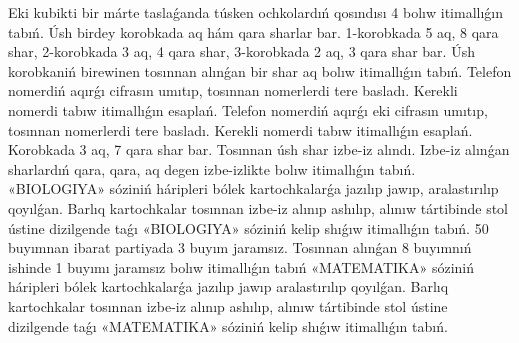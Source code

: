 Eki kubikti bir márte taslaǵanda túsken ochkolardıń qosındısı 4 bolıw itimallıǵın tabıń.
Úsh birdey korobkada aq hám qara sharlar bar. 1-korobkada 5 aq, 8 qara shar, 2-korobkada 3 aq, 4 qara shar, 3-korobkada 2 aq, 3 qara shar bar. Úsh korobkaniń birewinen tosınnan alınǵan bir shar aq bolıw itimallıǵın tabıń.
Telefon nomerdiń aqırǵı cifrasın umıtıp, tosınnan nomerlerdi tere basladı. Kerekli nomerdi tabıw itimallıǵın esaplań.
Telefon nomerdiń aqırǵı eki cifrasın umıtıp, tosınnan nomerlerdi tere basladı. Kerekli nomerdi tabıw itimallıǵın esaplań.
Korobkada 3 aq, 7 qara shar bar. Tosınnan úsh shar izbe-iz alındı. Izbe-iz alınǵan sharlardıń qara, qara, aq degen izbe-izlikte bolıw itimallıǵın tabıń.
«BIOLOGIYA» sóziniń háripleri bólek kartochkalarǵa jazılıp jawıp, aralastırılıp qoyılǵan. Barlıq kartochkalar tosınnan izbe-iz alınıp ashılıp, alınıw tártibinde stol ústine dizilgende taǵı «BIOLOGIYA» sóziniń kelip shıǵıw itimallıǵın tabıń.
50 buyımnan ibarat partiyada 3 buyım jaramsız. Tosınnan alınǵan 8 buyımnıń ishinde 1 buyımı jaramsız bolıw itimallıǵın tabıń
«MATEMATIKA» sóziniń háripleri bólek kartochkalarǵa jazılıp jawıp aralastırılıp qoyılǵan. Barlıq kartochkalar tosınnan izbe-iz alınıp ashılıp, alınıw tártibinde stol ústine dizilgende taǵı «MATEMATIKA» sóziniń kelip shıǵıw itimallıǵın tabıń.